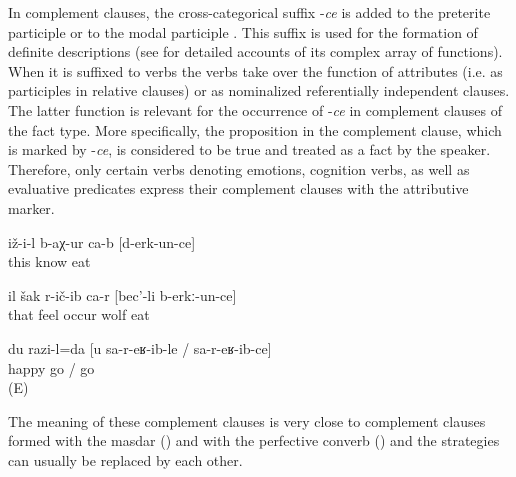 In complement clauses, the cross-categorical suffix -\textit{ce} is added to the preterite participle  or to the modal participle . This suffix is used for the formation of definite descriptions (see  for detailed accounts of its complex array of functions). When it is suffixed to verbs the verbs take over the function of attributes (i.e. as participles in relative clauses) or as nominalized referentially independent clauses. The latter function is relevant for the occurrence of -\textit{ce} in complement clauses of the fact type. More specifically, the proposition in the complement clause, which is marked by -\textit{ce}, is considered to be true and treated as a fact by the speaker. Therefore, only certain verbs denoting emotions, cognition verbs, as well as evaluative predicates express their complement clauses with the attributive marker. 
%
\begin{exe}
	\ex	\label{ex:He got to know that (they) ate (them)}
	\gll	iž-i-l	b-aχ-ur	ca-b	[d-erk-un-ce]\\
		this	know		eat\\
	\glt	{}

	\ex	\label{ex:‎‎She suspected that the wolf had eaten (the sisters)}
	\gll	il	šak	r-ič-ib	ca-r	[bec'-li	b-erkː-un-ce]\\
		that	feel	occur		wolf	eat\\
	\glt	{}

	\ex	\label{ex:‎‎‎I am happy that you came}
	\gll	du	razi-l=da	[u	sa-r-eʁ-ib-le	/	sa-r-eʁ-ib-ce]\\
			happy		go	/	go\\
	\glt	{} (E)
\end{exe}

The meaning of these complement clauses is very close to complement clauses formed with the masdar  () and with the perfective converb  () and the strategies can usually be replaced by each other.

